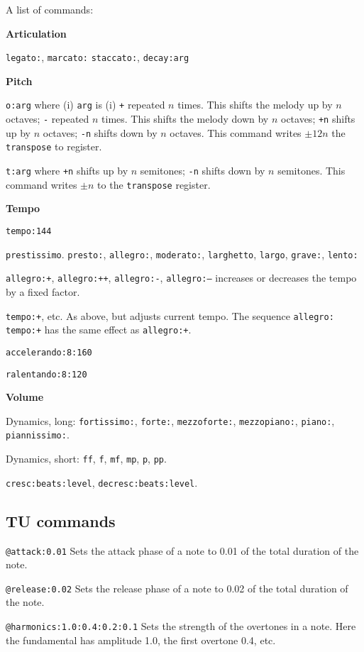 \documentclass[11pt]{amsart}
\begin{document}
A list of commands:

{\bf Articulation}

{\tt legato:}, {\tt marcato:} {\tt staccato:}, {\tt decay:arg}


{\bf Pitch}

{\tt o:arg} where (i) {\tt arg} is (i) {\tt +} repeated $n$ times.  This shifts
the melody up by $n$ octaves; {\tt -} repeated $n$ times.  This shifts
the melody down by $n$ octaves; {\tt +n} shifts up by $n$ octaves;
{\tt -n} shifts down by $n$ octaves.  This command writes $\pm 12n$ the
{\tt transpose} to register.

{\tt t:arg} where  {\tt +n} shifts up by $n$ semitones;
{\tt -n} shifts down by $n$ semitones.  This command writes $\pm n$ to the
{\tt transpose} register.

{\bf Tempo}


{\tt tempo:144}

{\tt prestissimo}. {\tt presto:}, {\tt allegro:}, {\tt moderato:}, {{\tt larghetto}, {\tt largo}, \tt grave:}, 
{\tt lento:}

{\tt allegro:+},  {\tt allegro:++}, {\tt allegro:-}, {\tt allegro:--} increases
or decreases the tempo by a fixed factor. 

{\tt tempo:+}, etc.  As above, but adjusts current tempo.  The sequence
{\tt allegro: tempo:+} has the same effect as {\tt allegro:+}.

{\tt accelerando:8:160}

{\tt ralentando:8:120}

{\bf Volume}

Dynamics, long: {\tt fortissimo:}, {\tt forte:}, {\tt mezzoforte:}, 
{\tt mezzopiano:}, {\tt piano:}, {\tt piannissimo:}.

Dynamics, short: {\tt ff},  {\tt f}, {\tt mf}, {\tt mp}, {\tt p}, {\tt pp}.

{\tt cresc:beats:level}, {\tt decresc:beats:level}. 


\subsection{TU commands}

{\tt @attack:0.01} Sets the attack phase of a note to 0.01 of the total duration of the note.

{\tt @release:0.02} Sets the release phase of a note to 0.02 of the total duration of the note.

{\tt @harmonics:1.0:0.4:0.2:0.1} Sets the strength of the overtones in a note. Here the fundamental
has amplitude 1.0, the first overtone 0.4, etc.
\end{document}
